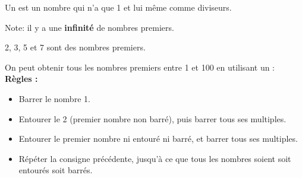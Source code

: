 \documentclass[a4paper]{article}
\begin{document}
\begin{cours}
	Un  est un nombre qui n'a que 1 et lui même comme diviseurs.
\end{cours}

Note: il y a une \textbf{infinité} de nombres premiers.

\begin{exemple}
	2, 3, 5 et 7 sont des nombres premiers.
\end{exemple}

\newpage

On peut obtenir tous les nombres premiers entre 1 et 100 en utilisant un  : \\

\textbf{Règles :}
\begin{itemize} \setlength\itemsep{0.3em}
	\item Barrer le nombre 1.
	\item Entourer le 2 (premier nombre non barré), puis barrer tous ses multiples.
	\item Entourer le premier nombre ni entouré ni barré, et barrer tous ses multiples.
	\item Répéter la consigne précédente, jusqu'à ce que tous les nombres soient soit entourés soit barrés.
\end{itemize}
\vspace{0.7cm}
\end{document}
